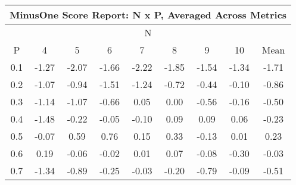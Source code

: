 \begin{longtable}{ | c || c | c | c | c | c | c | c || c |}
\hline
\multicolumn{9}{|c|}{ MinusOne Score Report: N x P, Averaged Across Metrics } \\
\hline
\multicolumn{9}{|c|}{ N } \\
\hline
P & 4 & 5 & 6 & 7 & 8 & 9 & 10 & Mean\\
\hline
\hline
\endhead
0.1 &  \cellcolor[HTML]{FFDFDF} -1.27 &  \cellcolor[HTML]{FFC7C7} -2.07 &  \cellcolor[HTML]{FFD7D7} -1.66 &  \cellcolor[HTML]{FFC7C7} -2.22 &  \cellcolor[HTML]{FFCFCF} -1.85 &  \cellcolor[HTML]{FFD7D7} -1.54 &  \cellcolor[HTML]{FFDFDF} -1.34 &  \cellcolor[HTML]{FFD7D7} -1.71 \\
0.2 &  \cellcolor[HTML]{FFE7E7} -1.07 &  \cellcolor[HTML]{FFE7E7} -0.94 &  \cellcolor[HTML]{FFD7D7} -1.51 &  \cellcolor[HTML]{FFDFDF} -1.24 &  \cellcolor[HTML]{FFEFEF} -0.72 &  \cellcolor[HTML]{FFF7F7} -0.44 &  \cellcolor[HTML]{FFFFFF} -0.10 &  \cellcolor[HTML]{FFE7E7} -0.86 \\
0.3 &  \cellcolor[HTML]{FFDFDF} -1.14 &  \cellcolor[HTML]{FFE7E7} -1.07 &  \cellcolor[HTML]{FFEFEF} -0.66 &  \cellcolor[HTML]{FFFFFF} 0.05 &  \cellcolor[HTML]{FFFFFF} 0.00 &  \cellcolor[HTML]{FFEFEF} -0.56 &  \cellcolor[HTML]{FFFFFF} -0.16 &  \cellcolor[HTML]{FFEFEF} -0.50 \\
0.4 &  \cellcolor[HTML]{FFD7D7} -1.48 &  \cellcolor[HTML]{FFF7F7} -0.22 &  \cellcolor[HTML]{FFFFFF} -0.05 &  \cellcolor[HTML]{FFFFFF} -0.10 &  \cellcolor[HTML]{FFFFFF} 0.09 &  \cellcolor[HTML]{FFFFFF} 0.09 &  \cellcolor[HTML]{FFFFFF} 0.06 &  \cellcolor[HTML]{FFF7F7} -0.23 \\
0.5 &  \cellcolor[HTML]{FFFFFF} -0.07 &  \cellcolor[HTML]{EFEFFF} 0.59 &  \cellcolor[HTML]{EFEFFF} 0.76 &  \cellcolor[HTML]{FFFFFF} 0.15 &  \cellcolor[HTML]{F7F7FF} 0.33 &  \cellcolor[HTML]{FFFFFF} -0.13 &  \cellcolor[HTML]{FFFFFF} 0.01 &  \cellcolor[HTML]{F7F7FF} 0.23 \\
0.6 &  \cellcolor[HTML]{F7F7FF} 0.19 &  \cellcolor[HTML]{FFFFFF} -0.06 &  \cellcolor[HTML]{FFFFFF} -0.02 &  \cellcolor[HTML]{FFFFFF} 0.01 &  \cellcolor[HTML]{FFFFFF} 0.07 &  \cellcolor[HTML]{FFFFFF} -0.08 &  \cellcolor[HTML]{FFF7F7} -0.30 &  \cellcolor[HTML]{FFFFFF} -0.03 \\
0.7 &  \cellcolor[HTML]{FFDFDF} -1.34 &  \cellcolor[HTML]{FFE7E7} -0.89 &  \cellcolor[HTML]{FFF7F7} -0.25 &  \cellcolor[HTML]{FFFFFF} -0.03 &  \cellcolor[HTML]{FFF7F7} -0.20 &  \cellcolor[HTML]{FFEFEF} -0.79 &  \cellcolor[HTML]{FFFFFF} -0.09 &  \cellcolor[HTML]{FFEFEF} -0.51 \\

\end{longtable}
